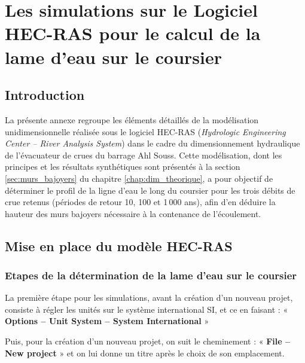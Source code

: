 
\chapter{Les simulations sur le Logiciel HEC-RAS pour le calcul de la lame d'eau sur le coursier}
\label{ann:hecras}

\section{Introduction}
\label{sec:ann1_intro}

La présente annexe regroupe les éléments détaillés de la modélisation unidimensionnelle réalisée sous le logiciel HEC-RAS (\textit{Hydrologic Engineering Center -- River Analysis System}) dans le cadre du dimensionnement hydraulique de l'évacuateur de crues du barrage Ahl Souss. Cette modélisation, dont les principes et les résultats synthétiques sont présentés à la section \ref{sec:murs_bajoyers} du chapitre \ref{chap:dim_theorique}, a pour objectif de déterminer le profil de la ligne d'eau le long du coursier pour les trois débits de crue retenus (périodes de retour 10, 100 et 1\,000 ans), afin d'en déduire la hauteur des murs bajoyers nécessaire à la contenance de l'écoulement.

\section{Mise en place du modèle HEC-RAS}
\label{sec:ann1_modele}

\subsection{Etapes de la détermination de la lame d'eau sur le coursier}
\label{subsec:ann1_geometrie}

La première étape pour les simulations, avant la création d'un nouveau projet, consiste à régler les unités sur le système international SI, et ce en faisant : « \textbf{Options -- Unit System -- System International} »

Puis, pour la création d'un nouveau projet, on suit le cheminement : « \textbf{File -- New project} » et on lui donne un titre après le choix de son emplacement.

